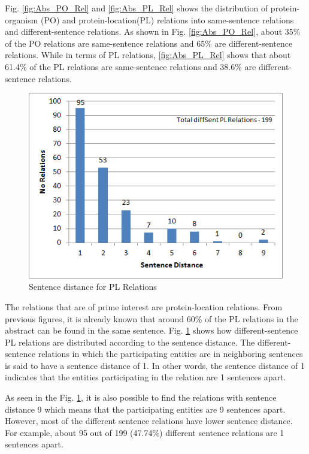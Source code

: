 Fig. \ref{fig:Abs_PO_Rel} and \ref{fig:Abs_PL_Rel} shows the distribution of protein-organism (PO) and protein-location(PL) relations into same-sentence relations and different-sentence relations. As shown in Fig. \ref{fig:Abs_PO_Rel}, about 35\% of the PO relations are same-sentence relations and 65\% are different-sentence relations. While in terms of PL relations, \ref{fig:Abs_PL_Rel} shows that about 61.4\% of the PL relations are same-sentence relations and 38.6\% are different-sentence relations.

\begin{figure}
\centering
\includegraphics[scale=0.9]{figures/SentenceDistance_PLRel.png}
\caption{Sentence distance for PL Relations}\label{fig:SentDistancePL}
\end{figure}

The relations that are of prime interest are protein-location relations. From previous figures, it is already known that around 60\% of the PL relations in the abstract can be found in the same sentence. Fig. \ref{fig:SentDistancePL} shows how different-sentence PL relations are distributed according to the sentence distance. The different-sentence relations in which the participating entities are in neighboring sentences is said to have a sentence distance of 1. In other words, the sentence distance of 1 indicates that the entities participating in the relation are 1 sentences apart.

As seen in the Fig. \ref{fig:SentDistancePL}, it is also possible to find the relations with sentence distance 9 which means that the participating entities are 9 sentences apart. However, most of the different sentence relations have lower sentence distance. For example, about 95 out of 199 (47.74\%) different sentence relations are 1 sentences apart.

